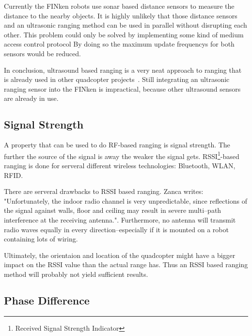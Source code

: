 Currently the FINken robots use sonar based distance sensors to measure the distance to the nearby objects.
It is highly unlikely that those distance sensors and an ultrasonic ranging method can be used in parallel without disrupting each other.
This problem could only be solved by implementing some kind of medium access control protocol
By doing so the maximum update frequencys for both sensors would be reduced.


In conclusion, ultrasound based ranging is a very neat approach to ranging that is already used in other quadcopter projects~\cite{ultrasonic_erlangen}.
Still integrating an ultrasonic ranging sensor into the FINken is impractical, because other ultrasound sensors are already in use.


\subsection{Signal Strength}

A property that can be used to do RF-based ranging is signal strength.
The further the source of the signal is away the weaker the signal gets.
RSSI\footnote{Received Signal Strength Indicator}-based ranging is done for serveral different wireless technologies: Bluetooth\cite{pei_using_2010}, WLAN\cite{wlanrssi, wlanrssi2}, RFID\cite{rfidrssi}.

There are serveral drawbacks to RSSI based ranging. Zanca \cite{Zanca} writes: "Unfortunately, the indoor radio channel is very
unpredictable, since reflections of the signal against walls, floor and ceiling may result in severe multi–path interference at the receiving antenna.".
Furthermore, no antenna will transmit radio waves equally in every direction–especially if it is mounted on a robot containing lots of wiring.

Ultimately, the orientaion and location of the quadcopter might have a bigger impact on the RSSI value than the actual range has.
Thus an RSSI based ranging method will probably not yield sufficient results.


\subsection{Phase Difference}

